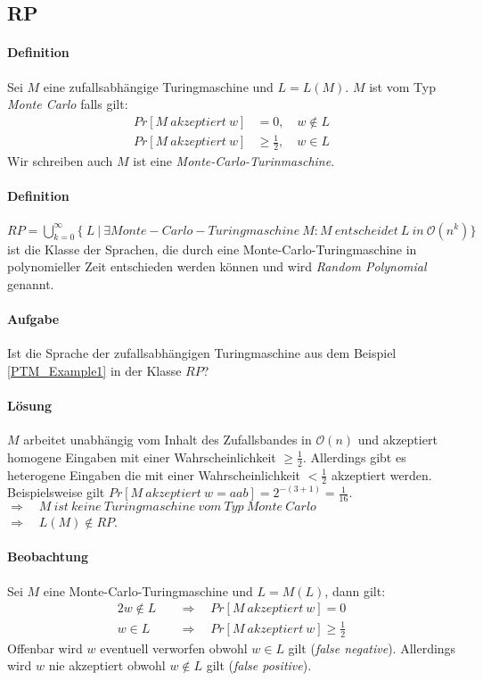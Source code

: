 \subsection{RP}
\paragraph{Definition}
Sei $M$ eine zufallsabhängige Turingmaschine und $L = L(M)$. $M$ ist vom Typ \emph{Monte Carlo} falls gilt:
\begin{align*}
	Pr[M\ akzeptiert\ w] & = 0,\quad w \notin L \\
	Pr[M\ akzeptiert\ w] & \geq \frac{1}{2},\quad w \in L
\end{align*}
Wir schreiben auch $M$ ist eine \emph{Monte-Carlo-Turinmaschine}.

\paragraph{Definition}
$RP = \bigcup\limits_{k=0}^{\infty} \bigl\{\ L\ \bigl\lvert\ \exists Monte-Carlo-Turingmaschine\ M : M\ entscheidet\ L\ in\ \mathcal{O}(n^k) \bigl\}$ ist die Klasse der Sprachen, die durch eine Monte-Carlo-Turingmaschine in polynomieller Zeit entschieden werden können und wird \emph{Random Polynomial} genannt.

\paragraph{Aufgabe}
Ist die Sprache der zufallsabhängigen Turingmaschine aus dem Beispiel \ref{PTM_Example1} in der Klasse $RP$?

\paragraph{Lösung}
$M$ arbeitet unabhängig vom Inhalt des Zufallsbandes in $\mathcal{O}(n)$ und akzeptiert homogene Eingaben mit einer Wahrscheinlichkeit $\geq \frac{1}{2}$.
Allerdings gibt es heterogene Eingaben die mit einer Wahrscheinlichkeit $< \frac{1}{2}$ akzeptiert werden.
Beispielsweise gilt $Pr[M\ akzeptiert\ w=aab] = 2^{-(3+1)} = \frac{1}{16}$. \\
$\Rightarrow \quad M\ ist\ keine\ Turingmaschine\ vom\ Typ\ Monte\ Carlo$ \\
$\Rightarrow \quad L(M) \notin RP$.

\paragraph{Beobachtung}
Sei $M$ eine Monte-Carlo-Turingmaschine und $L = M(L)$, dann gilt:
\begin{alignat}{2}
	w \notin L \quad & \Rightarrow \quad Pr[M\ akzeptiert\ w] = 0 \\
	w \in L \quad & \Rightarrow \quad Pr[M\ akzeptiert\ w] \geq \frac{1}{2}
\end{alignat}
Offenbar wird $w$ eventuell verworfen obwohl $w \in L$ gilt (\emph{false negative}).
Allerdings wird $w$ nie akzeptiert obwohl $w \notin L$ gilt (\emph{false positive}).

